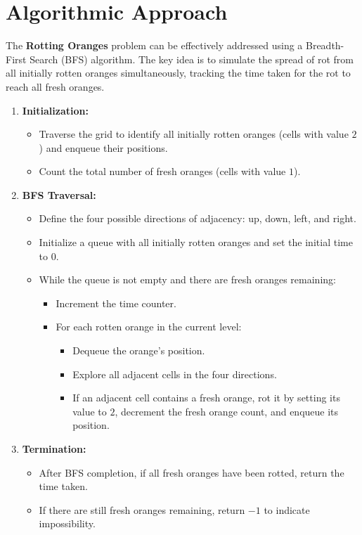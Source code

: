 \section*{Algorithmic Approach}

The \textbf{Rotting Oranges} problem can be effectively addressed using a Breadth-First Search (BFS) algorithm. The key idea is to simulate the spread of rot from all initially rotten oranges simultaneously, tracking the time taken for the rot to reach all fresh oranges.

\begin{enumerate}
    \item \textbf{Initialization:}
    \begin{itemize}
        \item Traverse the grid to identify all initially rotten oranges (cells with value \(2\)) and enqueue their positions.
        \item Count the total number of fresh oranges (cells with value \(1\)).
    \end{itemize}
    
    \item \textbf{BFS Traversal:}
    \begin{itemize}
        \item Define the four possible directions of adjacency: up, down, left, and right.
        \item Initialize a queue with all initially rotten oranges and set the initial time to \(0\).
        \item While the queue is not empty and there are fresh oranges remaining:
        \begin{itemize}
            \item Increment the time counter.
            \item For each rotten orange in the current level:
            \begin{itemize}
                \item Dequeue the orange's position.
                \item Explore all adjacent cells in the four directions.
                \item If an adjacent cell contains a fresh orange, rot it by setting its value to \(2\), decrement the fresh orange count, and enqueue its position.
            \end{itemize}
        \end{itemize}
    \end{itemize}
    
    \item \textbf{Termination:}
    \begin{itemize}
        \item After BFS completion, if all fresh oranges have been rotted, return the time taken.
        \item If there are still fresh oranges remaining, return \(-1\) to indicate impossibility.
    \end{itemize}
\end{enumerate}

